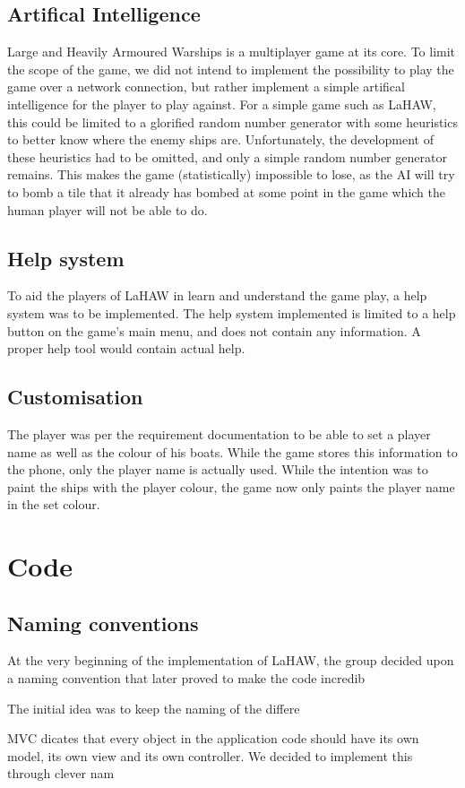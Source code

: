 \subsection{Artifical Intelligence}
Large and Heavily Armoured Warships is a multiplayer game at its core. To limit the scope of the game, we did not intend to implement the possibility to play the game over a network connection, but rather implement a simple artifical intelligence for the player to play against. For a simple game such as LaHAW, this could be limited to a glorified random number generator with some heuristics to better know where the enemy ships are. Unfortunately, the development of these heuristics had to be omitted, and only a simple random number generator remains. This makes the game (statistically) impossible to lose, as the AI will try to bomb a tile that it already has bombed at some point in the game which the human player will not be able to do.

\subsection{Help system}
To aid the players of LaHAW in learn and understand the game play, a help system was to be implemented. The help system implemented is limited to a help button on the game's main menu, and does not contain any information. A proper help tool would contain actual help.

\subsection{Customisation}
The player was per the requirement documentation to be able to set a player name as well as the colour of his boats. While the game stores this information to the phone, only the player name is actually used. While the intention was to paint the ships with the player colour, the game now only paints the player name in the set colour.



\section{Code}

\subsection{Naming conventions}
At the very beginning of the implementation of LaHAW, the group decided upon a naming convention that later proved to make the code incredib


The initial idea was to keep the naming of the differe


MVC dicates that every object in the application code should have its own model, its own view and its own controller. We decided to implement this through clever nam